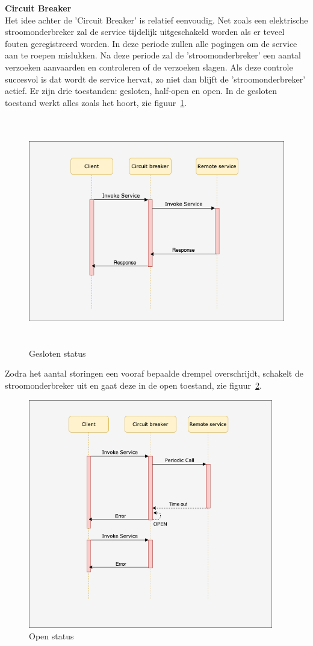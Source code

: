 \textbf{Circuit Breaker}\\
Het idee achter de 'Circuit Breaker' is relatief eenvoudig. Net zoals een elektrische stroomonderbreker zal de service tijdelijk uitgeschakeld worden als er teveel fouten geregistreerd worden. In deze periode zullen alle pogingen om de service aan te roepen mislukken. Na deze periode zal de 'stroomonderbreker' een aantal verzoeken aanvaarden en controleren of de verzoeken slagen. Als deze controle succesvol is dat wordt de service hervat, zo niet dan blijft de 'stroomonderbreker' actief.
Er zijn drie toestanden: gesloten, half-open en open. In de gesloten toestand werkt alles zoals het hoort, zie figuur~\ref{gesloten}. 

\begin{figure}[!htb]
    \centering
    \includegraphics[height=10cm]{closed.png}
    \caption{Gesloten status \label{gesloten}}
\end{figure}

Zodra het aantal storingen een vooraf bepaalde drempel overschrijdt, schakelt de stroomonderbreker uit en gaat deze in de open toestand, zie figuur~\ref{open}.
\begin{figure}[!htb]
    \centering
    \includegraphics[height=10cm]{open.png}
    \caption{Open status \label{open}}
\end{figure}

